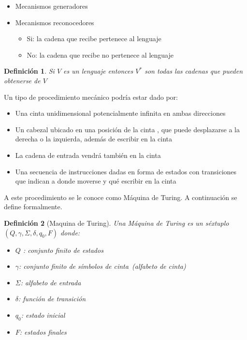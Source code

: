 \documentclass[a4paper,1pt]{report}
\newtheorem*{dfn}{Definición}
\begin{document}
\begin{itemize}
 \item Mecanismos generadores
 \item Mecanismos reconocedores
 \begin{itemize}
  \item Si: la cadena que recibe pertenece al lenguaje
  \item No: la cadena que recibe no pertenece al lenguaje
 \end{itemize}

\end{itemize}

\begin{dfn}
 Si $V$ es un lenguaje entonces $V^*$ son todas las cadenas que pueden obtenerse de $V$
\end{dfn}

Un tipo de procedimiento mecánico podría estar dado por: 
\begin{itemize}
 \item Una cinta unidimensional potencialmente infinita en ambas direcciones
 \item Un cabezal ubicado en una posición de la cinta , que puede desplazarse a la derecha o la izquierda, además de escribir en la cinta
 \item La cadena de entrada vendrá también en la cinta
 \item Una secuencia de instrucciones dadas en forma de estados con transiciones que indican a donde moverse y qué escribir en la cinta
\end{itemize}

A este procedimiento se le conoce como Máquina de Turing. A continuación se define formalmente.

\begin{dfn}[Maquina de Turing]
 Una Máquina de Turing es un séxtuplo $(Q,\gamma,\Sigma,\delta,q_0,F)$ donde:
 \begin{itemize}
  \item $Q$ : conjunto finito de estados
  \item $\gamma$: conjunto finito de símbolos de cinta~(alfabeto de cinta)
  \item $\Sigma$: alfabeto de entrada
  \item $\delta$: función de transición
  \item $q_0$: estado inicial
  \item $F$: estados finales
 \end{itemize}
\end{dfn}
\end{document}

